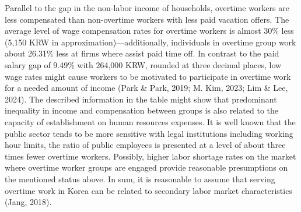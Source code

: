 \documentclass[
  12pt,
]{article}
\begin{document}
Parallel to the gap in the non-labor income of households, overtime
workers are less compensated than non-overtime workers with less paid
vacation offers. The average level of wage compensation rates for
overtime workers is almost 30\% less (5,150 KRW in
approximation)---additionally, individuals in overtime group work about
26.31\% less at firms where assist paid time off. In contrast to the
paid salary gap of 9.49\% with 264,000 KRW, rounded at three decimal
places, low wage rates might cause workers to be motivated to
participate in overtime work for a needed amount of income (Park \&
Park, 2019; M. Kim, 2023; Lim \& Lee, 2024). The described information
in the table might show that predominant inequality in income and
compensation between groups is also related to the capacity of
establishment on human resources expenses. It is well known that the
public sector tends to be more sensitive with legal institutions
including working hour limits, the ratio of public employees is
presented at a level of about three times fewer overtime workers.
Possibly, higher labor shortage rates on the market where overtime
worker groups are engaged provide reasonable presumptions on the
mentioned status above. In sum, it is reasonable to assume that serving
overtime work in Korea can be related to secondary labor market
characteristics (Jang, 2018).
\end{document}
